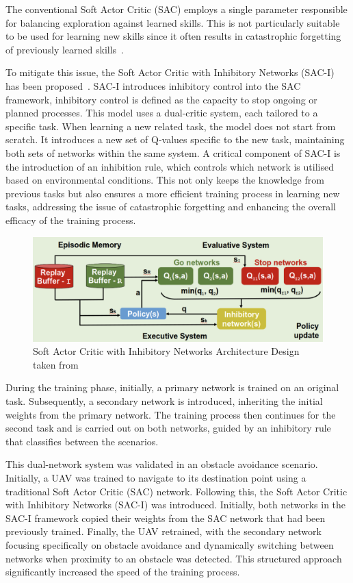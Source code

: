 The conventional Soft Actor Critic (SAC) employs a single parameter responsible for balancing exploration against learned skills.
This is not particularly suitable to be used for learning new skills since it often results in catastrophic forgetting of previously learned skills~\cite{fyp10-initial-transfer-learning}.

To mitigate this issue, the Soft Actor Critic with Inhibitory Networks (SAC-I) has been proposed~\cite{fyp10-sac-Inhibitory}.
SAC-I introduces inhibitory control into the SAC framework, inhibitory control is defined as the capacity to stop ongoing or planned processes.
This model uses a dual-critic system, each tailored to a specific task.
When learning a new related task, the model does not start from scratch.
It introduces a new set of Q-values specific to the new task, maintaining both sets of networks within the same system. 
A critical component of SAC-I is the introduction of an inhibition rule, which controls which network is utilised based on environmental conditions.
This not only keeps the knowledge from previous tasks but also ensures a more efficient training process in learning new tasks, addressing the issue of catastrophic forgetting and enhancing the overall efficacy of the training process.

\begin{figure}[htbp]
  \centering
  \includegraphics[width=\textwidth]{background/fyp-10-sac-inhibitors.png}
  \caption{Soft Actor Critic with Inhibitory Networks Architecture Design taken from~\cite{fyp10-sac-Inhibitory}}
\label{fig:fyp17-sacfd}
\end{figure}

During the training phase, initially, a primary network is trained on an original task.
Subsequently, a secondary network is introduced, inheriting the initial weights from the primary network.
The training process then continues for the second task and is carried out on both networks, guided by an inhibitory rule that classifies between the scenarios.

This dual-network system was validated in an obstacle avoidance scenario.
Initially, a UAV was trained to navigate to its destination point using a traditional Soft Actor Critic (SAC) network. 
Following this, the Soft Actor Critic with Inhibitory Networks (SAC-I) was introduced. 
Initially, both networks in the SAC-I framework copied their weights from the SAC network that had been previously trained. 
Finally, the UAV retrained, with the secondary network focusing specifically on obstacle avoidance and dynamically switching between networks when proximity to an obstacle was detected. 
This structured approach significantly increased the speed of the training process.


